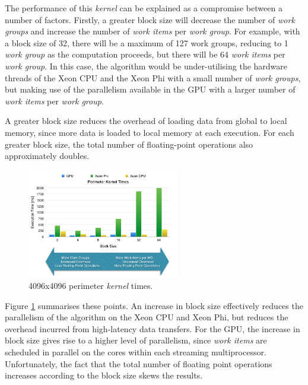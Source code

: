 \par{The performance of this \emph{kernel} can be explained as a compromise between 
    a number of factors. Firstly, a greater block size will decrease the 
    number of \emph{work groups} and increase the number of \emph{work items} per \emph{work group}. 
    For example, with a block size of 32, there will be a maximum of 127 work 
    groups, reducing to 1 \emph{work group} as the computation proceeds, but there 
    will be 64 \emph{work items} per \emph{work group}. In this case, the algorithm would 
    be under-utilising the hardware threads of the Xeon CPU and the Xeon Phi 
    with a small number of \emph{work groups}, but making use of the parallelism 
    available in the GPU with a larger number of \emph{work items} per \emph{work group}.}

\par{A greater block size reduces the overhead of loading data from global to 
    local memory, since more data is loaded to local memory at each execution. 
    For each greater block size, the total number of floating-point operations 
    also approximately doubles.}

\begin{figure}[!h]
    \centering
    \includegraphics[width=0.6\textwidth]{figures/PerimeterKernel1.png}
    \caption{4096x4096 perimeter \emph{kernel} times.}
    \label{PerimeterKernel1}
\end{figure}

\par{Figure \ref{PerimeterKernel1} summarises these points. An increase in block size 
    effectively reduces the parallelism of the algorithm on the Xeon CPU 
    and Xeon Phi, but reduces the overhead incurred from high-latency data 
    transfers. For the GPU, the increase in block size gives rise to a higher
    level of parallelism, since \emph{work items} are scheduled in parallel on the 
    cores within each streaming multiprocessor. Unfortunately, the fact that 
    the total number of floating point operations increases according to the 
    block size skews the results.}

